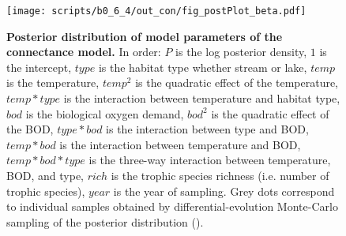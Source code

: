 \documentclass[11pt, oneside]{article}
\begin{document}
\begin{figure}[H]
\begin{center}
\texttt{[image: scripts/b0\_6\_4/out\_con/fig\_postPlot\_beta.pdf]}
\caption{
    \textbf{Posterior distribution of model parameters of the connectance model.}
    In order: $P$ is the log posterior density, $1$ is the intercept, $type$ is the habitat type whether stream or lake, $temp$ is the temperature, $temp^2$ is the quadratic effect of the temperature, $temp * type$ is the interaction between temperature and habitat type, $bod$ is the biological oxygen demand, $bod^2$ is the quadratic effect of the BOD, $type * bod$ is the interaction between type and BOD, $temp * bod$ is the interaction between temperature and BOD, $temp * bod * type$ is the three-way interaction between temperature, BOD, and type, $rich$ is the trophic species richness (i.e. number of trophic species), $year$ is the year of sampling.
    Grey dots correspond to individual samples obtained by differential-evolution Monte-Carlo sampling of the posterior distribution (\cite{TerBraak2006}). 
} 
\end{center}
\end{figure}
\end{document}
